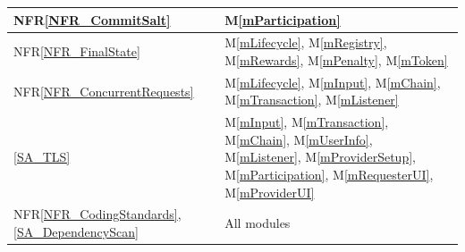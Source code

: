 \documentclass[12pt, titlepage]{article}
\newcommand{\mref}[1]{M\ref{#1}}
\newcommand{\nfrref}[1]{NFR\ref{#1}}
\begin{document}
\begin{longtable}{|p{}|p{}|}
\nfrref{NFR_CommitSalt}
& \mref{mParticipation} \\
\hline

\nfrref{NFR_FinalState}
& \mref{mLifecycle}, \mref{mRegistry}, \mref{mRewards}, \mref{mPenalty},
\mref{mToken} \\
\hline

\nfrref{NFR_ConcurrentRequests}
& \mref{mLifecycle}, \mref{mInput}, \mref{mChain}, \mref{mTransaction},
\mref{mListener} \\
\hline

\ref{SA_TLS}
& \mref{mInput}, \mref{mTransaction}, \mref{mChain}, \mref{mUserInfo},
\mref{mListener}, \mref{mProviderSetup}, \mref{mParticipation},
\mref{mRequesterUI}, \mref{mProviderUI} \\
\hline

\nfrref{NFR_CodingStandards}, \ref{SA_DependencyScan}
& All modules \\
\hline

\end{longtable}
\end{document}
